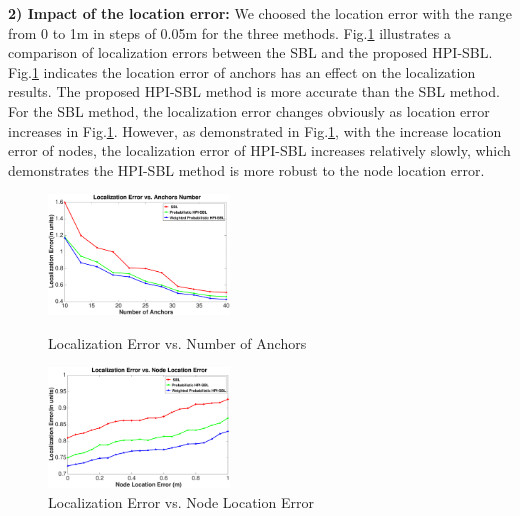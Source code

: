 		
\textbf{2) Impact of the location error:}
 We choosed the location error with the range from 0 to 1m in steps of 0.05m for the three methods. 
Fig.\ref{fig4} illustrates a comparison of localization errors between the  SBL and the proposed HPI-SBL.
 Fig.\ref{fig4} indicates the location error of anchors has an effect on the localization results. 
 The proposed HPI-SBL method is more accurate than the SBL method. 
 For the SBL method, the localization error changes obviously as location error increases in Fig.\ref{fig4}. 
 However, as demonstrated in Fig.\ref{fig4}, with the increase location error of nodes, the localization error of HPI-SBL increases relatively slowly, which demonstrates the HPI-SBL method is more robust to the node location error.
 \begin{figure}[!htb]
 	\centering
 	\begin{minipage}[t]{0.49\linewidth}
 		\centering
 		\setlength{\abovecaptionskip}{-15pt}
 		\vspace{-0.5mm}
 		\setlength{\belowcaptionskip}{-5pt}
 		\includegraphics[height=3.2cm,width = 1.1\linewidth]{image/nodenumber.eps}
 		\vspace{6mm}
 		\caption{Localization Error vs. Number of Anchors}
 		\label{fig3}
 	\end{minipage} 
 	\begin{minipage}[t]{0.49\linewidth}
 		\centering
 		\setlength{\abovecaptionskip}{-15pt}
 		\vspace{-0.5mm}
 		\setlength{\belowcaptionskip}{-5pt}
 		\includegraphics[height=3.2cm,width = 1.1\linewidth]{image/location.eps}
 		\vspace{6mm}
 		\caption{Localization Error vs. Node Location Error}
 		\label{fig4}
 	\end{minipage}
 	\vspace{-2mm}
 \end{figure}

